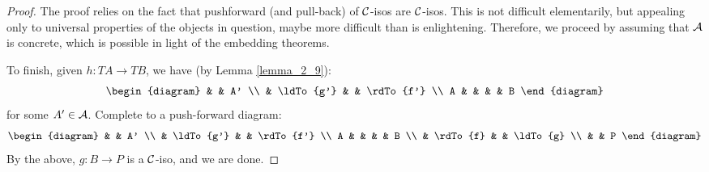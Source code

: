 \begin{proof}
The proof relies on the fact that pushforward (and pull-back) of 
$\mathcal{C}$-isos are $\mathcal{C}$-isos. This is not difficult 
elementarily, but appealing only to universal properties of the
objects in question, maybe more difficult than is enlightening.
Therefore, we proceed by assuming that $\mathcal{A}$ is concrete, 
which is possible in light of the embedding theorems.

To finish, given $h: TA \to TB$, we have (by Lemma 
\ref{lemma_2_9}):
\[
\begin{diagram}
  &           & A' \\
  & \ldTo{g'} &    & \rdTo{f'} \\
A &           &    &           & B
\end{diagram}
\]
for some $A' \in \mathcal{A}$. Complete to a push-forward diagram:
\[
\begin{diagram}
  &           & A' \\
  & \ldTo{g'} &    & \rdTo{f'} \\
A &           &    &           & B \\
  & \rdTo{f}  &    & \ldTo{g}  \\
  &           & P
\end{diagram}
\]
By the above, $g: B \to P$ is a $\mathcal{C}$-iso, and we are done.
\end{proof}
